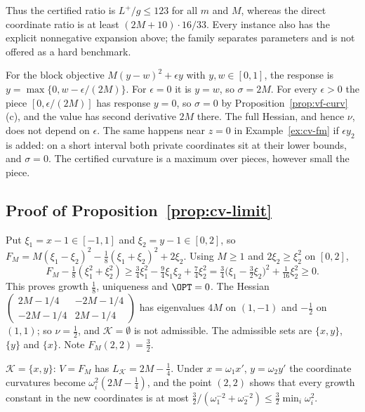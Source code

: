 Thus the certified ratio is $L^+/g\le123$ for all $m$ and $M$, whereas the
direct coordinate ratio is at least $(2M+10)\cdot16/33$. Every instance also
has the explicit nonnegative expansion above; the family separates
parameters and is not offered as a hard benchmark.

\begin{remark}\label{rem:cv-unstable}
For the block objective $M(y-w)^2+\epsilon y$ with $y,w\in[0,1]$, the
response is $y=\max\{0,w-\epsilon/(2M)\}$. For $\epsilon=0$ it is $y=w$, so
$\sigma=2M$. For every $\epsilon>0$ the piece $[0,\epsilon/(2M)]$ has
response $y=0$, so $\sigma=0$ by Proposition~\ref{prop:vf-curv}(c), and the
value has second derivative $2M$ there. The full Hessian, and hence $\nu$,
does not depend on $\epsilon$. The same happens near $z=0$ in
Example~\ref{ex:cv-fm} if $\epsilon y_2$ is added: on a short interval both
private coordinates sit at their lower bounds, and $\sigma=0$. The certified
curvature is a maximum over pieces, however small the piece.
\end{remark}

\subsection{Proof of Proposition~\ref{prop:cv-limit}}

Put $\xi_1=x-1\in[-1,1]$ and $\xi_2=y-1\in[0,2]$, so
$F_M=M(\xi_1-\xi_2)^2-\frac18(\xi_1+\xi_2)^2+2\xi_2$. Using $M\ge1$ and
$2\xi_2\ge\xi_2^2$ on $[0,2]$,
\[
F_M-\tfrac18(\xi_1^2+\xi_2^2)\ge\tfrac34\xi_1^2-\tfrac94\xi_1\xi_2+\tfrac74\xi_2^2
=\tfrac34\bigl(\xi_1-\tfrac32\xi_2\bigr)^2+\tfrac1{16}\xi_2^2\ge0.
\]
This proves growth $\frac18$, uniqueness and $\OPT=0$. The Hessian
$\left(\begin{smallmatrix}2M-1/4&-2M-1/4\\-2M-1/4&2M-1/4\end{smallmatrix}\right)$
has eigenvalues $4M$ on $(1,-1)$ and $-\frac12$ on $(1,1)$; so $\nu=\frac12$,
and $\mathcal K=\emptyset$ is not admissible. The admissible sets are
$\{x,y\}$, $\{y\}$ and $\{x\}$. Note $F_M(2,2)=\frac32$.

$\mathcal K=\{x,y\}$: $V=F_M$ has $L_{\mathcal K}=2M-\frac14$. Under
$x=\omega_1x'$, $y=\omega_2y'$ the coordinate curvatures become
$\omega_i^2(2M-\frac14)$, and the point $(2,2)$ shows that every growth
constant in the new coordinates is at most
$\frac32/(\omega_1^{-2}+\omega_2^{-2})\le\frac32\min_i\omega_i^2$.

